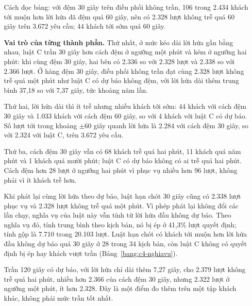 Cách đọc bảng: với đệm 30 giây trên điều phối không trần, 106 trong 2.434 khách tới muộn hơn lời hứa đã đệm quá 60
giây, nên có 2.328 lượt không trễ quá 60 giây trên 3.672 yêu cầu; 44 khách tới sớm quá 60 giây.

\textbf{Vai trò của từng thành phần.} Thứ nhất, ở mức kéo dài lời hứa gần bằng nhau, luật C trần 30 giây hơn cách đệm
ở ngưỡng một phút và kém ở ngưỡng hai phút: khi cùng đệm 30 giây, hai bên có 2.336 so với 2.328 lượt và 2.338 so với
2.366 lượt. Ở hàng đệm 30 giây, điều phối không trần đạt cùng 2.328 lượt không trễ quá một phút như luật C có dự báo
không đệm, với lời hứa dài thêm trung bình 37,18 so với 7,37 giây, tức khoảng năm lần.

Thứ hai, lời hứa dài thì ít trễ nhưng nhiều khách tới sớm: 44 khách với cách đệm 30 giây và 1.033 khách với cách đệm 60
giây, so với 4 khách với luật C có dự báo. Số lượt tới trong khoảng $\pm$60 giây quanh lời hứa là 2.284 với cách đệm 30
giây, so với 2.324 với luật C, trên 3.672 yêu cầu.

Thứ ba, cách đệm 30 giây vẫn có 68 khách trễ quá hai phút, 11 khách quá năm phút và 1 khách quá mười phút; luật C có
dự báo không có ai trễ quá hai phút. Cách đệm hơn 28 lượt ở ngưỡng hai phút vì phục vụ nhiều hơn 96 lượt, không phải vì
ít khách trễ hơn.

Khi phát lại cùng lời hứa theo dự báo, luật hạn chót 30 giây cũng có 2.338 lượt phục vụ và 2.328 lượt không trễ quá
một phút. Vì phép phát lại không đổi các lần chạy, nghĩa vụ của luật này vẫn tính từ lời hứa đầu không dự báo. Theo
nghĩa vụ đó, tính trung bình theo kịch bản, nó bị ép ở 41,3\% lượt quyết định; tính gộp là 7.710 trong 20.103 lượt.
Luật hạn chót có khách tới muộn hơn lời hứa đầu không dự báo quá 30 giây ở 28 trong 34 kịch bản, còn luật C không có
quyết định bị ép hay khách vượt trần (Bảng~\ref{bang:c4-nghiavu}).

Trần 120 giây có dự báo, với lời hứa chỉ dài thêm 7,27 giây, cho 2.379 lượt không trễ quá hai phút, nhiều hơn 2.366
của cách đệm 30 giây, nhưng 2.322 lượt ở ngưỡng một phút, ít hơn 2.328. Đây là một điểm đo thêm trên một tập khách khác,
không phải mức trần tốt nhất.

